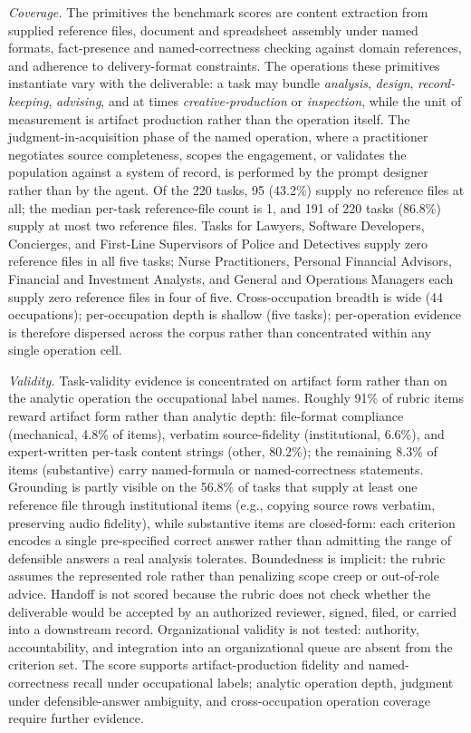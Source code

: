 \documentclass{article}
\begin{document}
\textit{Coverage.}
The primitives the benchmark scores are content extraction from supplied reference files, document and spreadsheet assembly under named formats, fact-presence and named-correctness checking against domain references, and adherence to delivery-format constraints.
The operations these primitives instantiate vary with the deliverable: a task may bundle \emph{analysis}, \emph{design}, \emph{record-keeping}, \emph{advising}, and at times \emph{creative-production} or \emph{inspection}, while the unit of measurement is artifact production rather than the operation itself.
The judgment-in-acquisition phase of the named operation, where a practitioner negotiates source completeness, scopes the engagement, or validates the population against a system of record, is performed by the prompt designer rather than by the agent.
Of the 220 tasks, 95 (43.2\%) supply no reference files at all; the median per-task reference-file count is 1, and 191 of 220 tasks (86.8\%) supply at most two reference files.
Tasks for Lawyers, Software Developers, Concierges, and First-Line Supervisors of Police and Detectives supply zero reference files in all five tasks; Nurse Practitioners, Personal Financial Advisors, Financial and Investment Analysts, and General and Operations Managers each supply zero reference files in four of five.
Cross-occupation breadth is wide (44 occupations); per-occupation depth is shallow (five tasks); per-operation evidence is therefore dispersed across the corpus rather than concentrated within any single operation cell.

\textit{Validity.}
Task-validity evidence is concentrated on artifact form rather than on the analytic operation the occupational label names.
Roughly 91\% of rubric items reward artifact form rather than analytic depth: file-format compliance (mechanical, 4.8\% of items), verbatim source-fidelity (institutional, 6.6\%), and expert-written per-task content strings (other, 80.2\%); the remaining 8.3\% of items (substantive) carry named-formula or named-correctness statements.
Grounding is partly visible on the 56.8\% of tasks that supply at least one reference file through institutional items (e.g., copying source rows verbatim, preserving audio fidelity), while substantive items are closed-form: each criterion encodes a single pre-specified correct answer rather than admitting the range of defensible answers a real analysis tolerates.
Boundedness is implicit: the rubric assumes the represented role rather than penalizing scope creep or out-of-role advice.
Handoff is not scored because the rubric does not check whether the deliverable would be accepted by an authorized reviewer, signed, filed, or carried into a downstream record.
Organizational validity is not tested: authority, accountability, and integration into an organizational queue are absent from the criterion set.
The score supports artifact-production fidelity and named-correctness recall under occupational labels; analytic operation depth, judgment under defensible-answer ambiguity, and cross-occupation operation coverage require further evidence.
\end{document}
